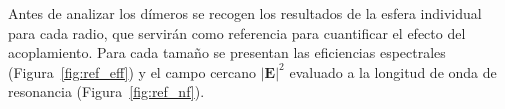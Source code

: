 
Antes de analizar los dímeros se recogen los resultados de la esfera individual
para cada radio, que servirán como referencia para cuantificar el efecto del
acoplamiento. Para cada tamaño se presentan las eficiencias espectrales
(Figura~\ref{fig:ref_eff}) y el campo cercano $|\mathbf{E}|^2$ evaluado a la
longitud de onda de resonancia (Figura~\ref{fig:ref_nf}).

